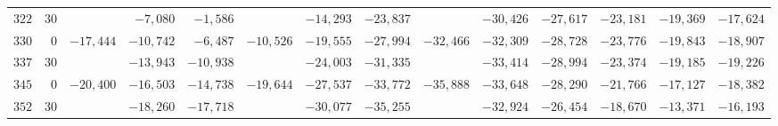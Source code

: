 \begin{landscape}
\begin{longtable}{@{}rr|r|r|r|r|r|r|r|r|r|r|r|r@{}}
\(322\) & \(30\) &  & \(-7{,}080\) & \(-1{,}586\) &  & \(-14{,}293\) & \(-23{,}837\) &  & \(-30{,}426\) & \(-27{,}617\) & \(-23{,}181\) & \(-19{,}369\) & \(-17{,}624\)\\[2pt]
\(330\) & \(0\) & \(-17{,}444\) & \(-10{,}742\) & \(-6{,}487\) & \(-10{,}526\) & \(-19{,}555\) & \(-27{,}994\) & \(-32{,}466\) & \(-32{,}309\) & \(-28{,}728\) & \(-23{,}776\) & \(-19{,}843\) & \(-18{,}907\)\\
\(337\) & \(30\) &  & \(-13{,}943\) & \(-10{,}938\) &  & \(-24{,}003\) & \(-31{,}335\) &  & \(-33{,}414\) & \(-28{,}994\) & \(-23{,}374\) & \(-19{,}185\) & \(-19{,}226\)\\
\(345\) & \(0\) & \(-20{,}400\) & \(-16{,}503\) & \(-14{,}738\) & \(-19{,}644\) & \(-27{,}537\) & \(-33{,}772\) & \(-35{,}888\) & \(-33{,}648\) & \(-28{,}290\) & \(-21{,}766\) & \(-17{,}127\) & \(-18{,}382\)\\
\(352\) & \(30\) &  & \(-18{,}260\) & \(-17{,}718\) &  & \(-30{,}077\) & \(-35{,}255\) &  & \(-32{,}924\) & \(-26{,}454\) & \(-18{,}670\) & \(-13{,}371\) & \(-16{,}193\)\\
\end{longtable}
\clearpage
\endgroup
\end{landscape}
\clearpage
